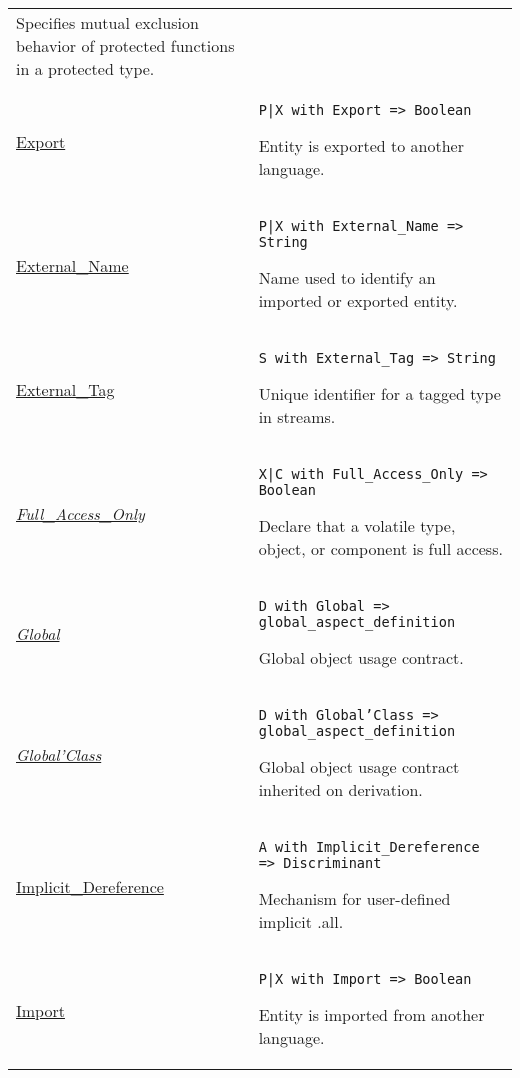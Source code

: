 \documentclass[english]{article}
\begin{document}
\begin{scriptsize}
\begin{multicols*}{3}
\begin{tabular}{@{}p{2cm}p{6.5cm}}
   Specifies mutual exclusion behavior of protected functions in a protected type. \\

   \href{http://www.ada-auth.org/standards/22rm/html/RM-B-1.html}{Export} & \texttt{P|X with Export => Boolean}

   Entity is exported to another language.\\

   \href{http://www.ada-auth.org/standards/22rm/html/RM-B-1.html}{External\_Name} & \texttt{P|X with External\_Name => String}

   Name used to identify an imported or exported entity.\\

   \href{http://www.ada-auth.org/standards/22rm/html/RM-13-3.html}{External\_Tag} & \texttt{S with External\_Tag => String}

   Unique identifier for a tagged type in streams.\\

   \href{http://www.ada-auth.org/standards/22rm/html/RM-C-6.html}{\textit{Full\_Access\_Only}} & \texttt{X|C with Full\_Access\_Only => Boolean}

   Declare that a volatile type, object, or component is full access.\\

   \href{http://www.ada-auth.org/standards/22rm/html/RM-6-1-2.html}{\textit{Global}} & \texttt{D with Global => global\_aspect\_definition}

   Global object usage contract.\\

   \href{http://www.ada-auth.org/standards/22rm/html/RM-6-1-2.html}{\textit{Global'Class}} & \texttt{D with Global'Class => global\_aspect\_definition}

   Global object usage contract inherited on derivation.\\

   \href{http://www.ada-auth.org/standards/22rm/html/RM-4-1-5.html}{Implicit\_Dereference} & \texttt{A with Implicit\_Dereference => Discriminant}

   Mechanism for user-defined implicit .all.\\

   \href{http://www.ada-auth.org/standards/22rm/html/RM-B-1.html}{Import} & \texttt{P|X with Import => Boolean}

   Entity is imported from another language. \\


\end{tabular}
\end{multicols*}
\end{scriptsize}
\end{document}
